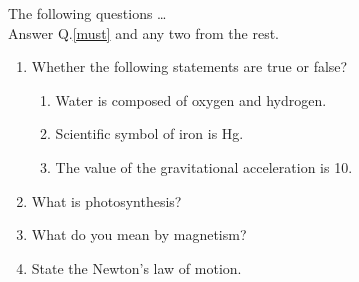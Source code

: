 \documentclass[11pt,a4paper]{article}
\begin{document}
    The following questions …\\ Answer Q.\ref{must} and any two from the rest.
    \begin{enumerate}
        \item Whether the following statements are true or false?\label{must}
        \begin{enumerate}
            \item Water is composed of oxygen and hydrogen.
            \item Scientific symbol of iron is Hg.
            \item The value of the gravitational acceleration is 10.
        \end{enumerate}
        \item What is photosynthesis?
        \item What do you mean by magnetism?
        \item State the Newton's law of motion.
    \end{enumerate}
\end{document}
